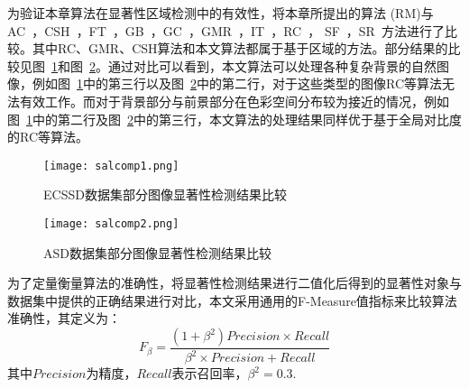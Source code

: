 为验证本章算法在显著性区域检测中的有效性，将本章所提出的算法 (RM)与AC~\cite{Achanta08}，CSH~\cite{Yan2014Hierarchical}，FT~\cite{saliencyFilter}，GB~\cite{Harel07graph-basedvisual}，GC~\cite{GC}，GMR~\cite{GMR}，IT~\cite{itti}，RC~\cite{ChengPAMI}， SF~\cite{saliencyFilter}，SR~\cite{SR}方法进行了比较。其中RC、GMR、CSH算法和本文算法都属于基于区域的方法。部分结果的比较见图~\ref{fig:chap2:comp1}和图~\ref{fig:chap2:comp2}。通过对比可以看到，本文算法可以处理各种复杂背景的自然图像，例如图~\ref{fig:chap2:comp1}中的第三行以及图~\ref{fig:chap2:comp2}中的第二行，对于这些类型的图像RC等算法无法有效工作。而对于背景部分与前景部分在色彩空间分布较为接近的情况，例如图~\ref{fig:chap2:comp1}中的第二行及图~\ref{fig:chap2:comp2}中的第三行，本文算法的处理结果同样优于基于全局对比度的RC等算法。\par
\begin{figure}[h]
  \centering%
      {\texttt{[image: salcomp1.png]}}

  \caption{ECSSD数据集部分图像显著性检测结果比较}
  \label{fig:chap2:comp1}
\end{figure}
\begin{figure}[h]
  \centering%
      {\texttt{[image: salcomp2.png]}}

  \caption{ASD数据集部分图像显著性检测结果比较}
  \label{fig:chap2:comp2}
\end{figure}
为了定量衡量算法的准确性，将显著性检测结果进行二值化后得到的显著性对象与数据集中提供的正确结果进行对比，本文采用通用的F-Measure值指标来比较算法准确性，其定义为：
$$F_{\beta} = \frac{(1+\beta^2)Precision \times Recall}{\beta^2 \times Precision + Recall}$$
其中$Precision$为精度，$Recall$表示召回率，$\beta^2=0.3$. \par

